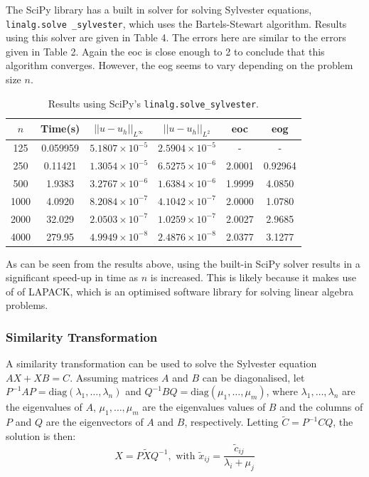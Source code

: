 \documentclass{article}
\numberwithin{equation}{section}
\begin{document}
The SciPy library has a built in solver for solving Sylvester equations, \texttt{linalg.solve \_sylvester}, which uses the Bartels-Stewart algorithm. Results using this solver are given in Table 4. The errors here are similar to the errors given in Table 2. Again the eoc is close enough to 2 to conclude that this algorithm converges. However, the eog seems to vary depending on the problem size $n$. 

\begin{table}[H]
\centering
\begin{tabular}{|c|c|c|c|c|c|}
\hline
$n$ & Time(s) & $|| u - u_h ||_{L^{\infty}}$ &$|| u - u_h ||_{L^{2}}$ & eoc & eog \\
\hline
125 & 0.059959 & $5.1807 \times 10^{-5}$ & $2.5904 \times 10^{-5}$ & - & - \\
250 & 0.11421 & $1.3054 \times 10^{-5}$ & $6.5275 \times 10^{-6}$ & 2.0001 & 0.92964 \\
500 & 1.9383 & $3.2767 \times 10^{-6}$ & $1.6384 \times 10^{-6}$ & 1.9999 & 4.0850  \\
1000 & 4.0920 & $8.2084 \times 10^{-7}$ & $4.1042 \times 10^{-7}$ & 2.0000 & 1.0780 \\
2000 & 32.029 & $2.0503 \times 10^{-7}$ & $1.0259 \times 10^{-7}$ & 2.0027 & 2.9685  \\
4000 & 279.95 & $4.9949 \times 10^{-8}$ & $2.4876 \times 10^{-8}$ & 2.0377 & 3.1277  \\
\hline
\end{tabular}
\caption{Results using SciPy's \texttt{linalg.solve\_sylvester}.}
\end{table}

As can be seen from the results above, using the built-in SciPy solver results in a significant speed-up in time as $n$ is increased. This is likely because it makes use of of LAPACK, which is an optimised software library for solving linear algebra problems.


\subsubsection{Similarity Transformation}
A similarity transformation \cite{Simoncini} can be used to solve the Sylvester equation $AX + XB = C$. Assuming matrices $A$ and $B$ can be diagonalised, let $P^{-1}AP = \text{diag}(\lambda_1, \dots, \lambda_n)$ and $Q^{-1}BQ = \text{diag}(\mu_1, \dots, \mu_m)$, where $\lambda_1, \dots, \lambda_n$ are the eigenvalues of $A$, $\mu_1, \dots, \mu_m$ are the eigenvalues values of $B$ and the columns of $P$ and $Q$ are the eigenvectors of $A$ and $B$, respectively. Letting $\widetilde{C} = P^{-1}CQ$, the solution is then:
\[ X = P \widetilde{X} Q^{-1}, \text{ with } \widetilde{x}_{ij} = \frac{\widetilde{c}_{ij}}{\lambda_i + \mu_j} \]
\end{document}
